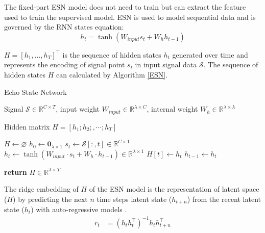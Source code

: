 The fixed-part ESN model does not need to train but can extract the feature used to train the supervised model\cite{cucchi2022hands, bianchi2020reservoir, jaeger2002adaptive}. ESN is used to model sequential data and is governed by the RNN states equation\cite{bianchi2020reservoir}:
\begin{equation*}
    h_t = \tanh(W_{input}s_t + W_hh_{t-1})
\end{equation*}

$H = [h_1,\ldots,h_T]^\top$ is the sequence of hidden states $h_t$ generated over time and represents the encoding of signal point $s_t$ in input signal data $\mathcal{S}$. The sequence of hidden states $H$ can calculated by Algorithm \ref{ESN}.

\begin{algorithm}
    \caption{Echo State Network}
    \label{ESN}
    \begin{algorithmic}[1]
        \renewcommand{\algorithmicrequire}{\textbf{Input:}}
        \renewcommand{\algorithmicensure}{\textbf{Output:}}
        \Require Signal $\mathcal{S}\in\mathbb{R}^{C\times T}$, input weight $W_{input}\in\mathbb{R}^{\lambda\times C}$, internal weight $W_h\in\mathbb{R}^{\lambda\times\lambda}$

        \Ensure Hidden matrix $H = [h_1; h_2;,\cdots;h_{T}]$

        
        \State  $H\gets \varnothing$ 
        \State  $h_{0} \gets \mathbf{0}_{\lambda\times 1}$
            \State $s_{t}\gets \mathcal{S}[:, t]\in\mathbb{R}^{C\times 1}$
            \State $h_{t} \gets \tanh(W_{input}\cdot s_{t} + W_{h}\cdot h_{t-1})\in\mathbb{R}^{\lambda\times 1}$
            \State $H[t]\gets h_{t}$
            \State $h_{t-1} \gets h_{t}$

        \EndFor
    \State \textbf{return} $H\in\mathbb{R}^{\lambda\times T}$
    \end{algorithmic}
\end{algorithm}

The ridge embedding of $H$ of the ESN model is the representation of latent space ($H$) by predicting the next $n$ time steps latent state ($h_{t+n}$) from the recent latent state ($h_t$) with auto-regressive models \cite{bianchi2020reservoir}.
\begin{align*}
    r_t &=  (h_t h_t^\top)^{-1} h_t h_{t+n}^\top
\end{align*}

